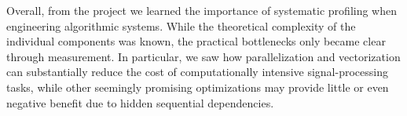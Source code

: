 \documentclass[sigconf]{acmart}
\begin{document}
    Overall, from the project we learned the importance of systematic profiling when engineering algorithmic systems. While the theoretical complexity of the individual components was known, the practical bottlenecks only became clear through measurement. In particular, we saw how parallelization and vectorization can substantially reduce the cost of computationally intensive signal-processing tasks, while other seemingly promising optimizations may provide little or even negative benefit due to hidden sequential dependencies. 

    
    
\end{document}
